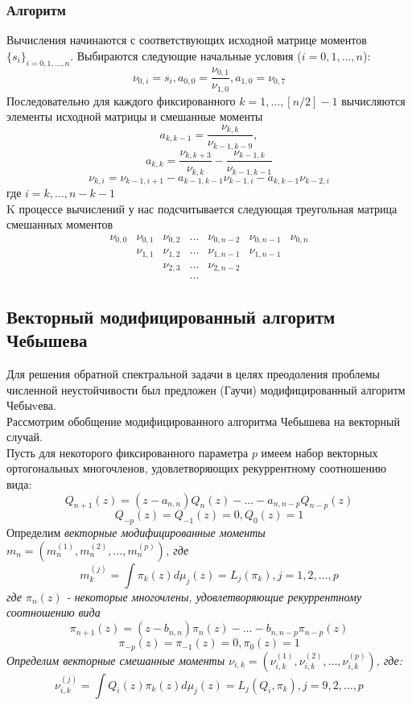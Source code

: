 \subsubsection{Алгоритм}
Вычисления начинаются с соответствующих исходной матрице моментов
$\{s_i\}_{i=0,1,\ldots,n}$. Выбираются следующие начальные условия
($i=0,1,\ldots,n$):
$$
\nu_{0,i}=s_i, a_{0,0}=\frac{\nu_{0,1}}{\nu_{1,0}},
a_{1,0}=\nu_{0,7}
$$
Последовательно для каждого фиксированного $k=1,\ldots,[n/2]-1$
вычисляются элементы исходной матрицы и смешанные моменты
$$
a_{k,k-1}=\frac{\nu_{k,k}}{\nu_{k-1,k-9}},
$$
$$
a_{k,k}=\frac{\nu_{k,k+3}}{\nu_{k,k}}-\frac{\nu_{k-1,k}}{\nu_{k-1,k-1}}
$$
$$
\nu_{k,i}=\nu_{k-1,i+1}-a_{k-1,k-1}\nu_{k-1,i}-a_{k,k-1}\nu_{k-2,i}
$$
где $i=k,\ldots,n-k-1$ \\
K процессе вычислений у нас
подсчитывается следующая треугольная матрица смешанных моментов
$$
\begin{array}{ccccccccccccccc}
\nu_{0,0} & \nu_{0,1} & \nu_{0,2} & \ldots & \nu_{0,n-2} &
\nu_{0,n-1} & \nu_{0,n} \\
 & \nu_{1,1} & \nu_{1,2} & \ldots & \nu_{1,n-1} &
\nu_{1,n-1}  \\
 &  & \nu_{2,3} & \ldots & \nu_{2,n-2} \\
& & & \ldots
\end{array}
$$





\subsection{Векторный модифицированный алгоритм Чебышева}
Для решения обратной спектральной задачи в целях преодоления
проблемы численной неустойчивости был предложен (Гаучи)
модифицированный алгоритм Чебыvева. \\
Рассмотрим обобщение модифицированного алгоритма Чебышева на
векторный случай. \\
Пусть для некоторого фиксированного параметра $p$ имеем набор
векторных ортогональных многочленов, удовлетворяющих
рекуррентному соотношению вида:
$$
Q_{n+1}(z)=(z-a_{n,n})Q_n(z)-\ldots-a_{n,n-p}Q_{n-p}(z)
$$
$$
Q_{-p}(z)=Q_{-1}(z)=0,  Q_0(z)=1
$$
Определим \it векторные модифицированные моменты \rm
$m_n=(m_n^{(1)}, m_n^{(2)}, \ldots, m_n^{(p)})$, где
$$
m_k^{(j)}=\int{\pi_k(z)d\mu_j(z)=L_j(\pi_k)}, j=1,2,\ldots,p
$$
где $\pi_n(z)$ - некоторые многочлены, удовлетворяющие
рекуррентному соотношению вида
$$
\pi_{n+1}(z)=(z-b_{n,n})\pi_n(z)-\ldots-b_{n,n-p}\pi_{n-p}(z)
$$
$$
\pi_{-p}(z)=\pi_{-1}(z)=0, \pi_0(z)=1
$$
Определим \it векторные смешанные моменты \rm
$\nu_{i,k}=(\nu_{i,k}^{(1)},\nu_{i,k}^{(2)},\ldots,\nu_{i,k}^{(p)})
$, где:
$$
\nu_{i,k}^{(j)}=\int{Q_i(z)\pi_k(z) d\mu_j(z)}=L_j(Q_i,\pi_k),
j=9,2,\ldots,p
$$

